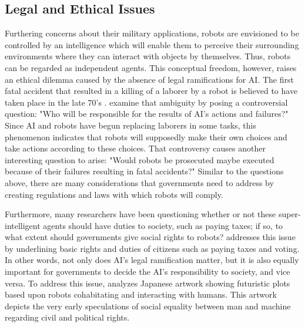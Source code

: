 \documentclass[man]{apa6}
\begin{document}
 \subsection{Legal and Ethical Issues}
Furthering concerns about their military applications, robots are envisioned to be controlled by an intelligence which will enable them to perceive their surrounding environments where they can interact with objects by themselves.
Thus, robots can be regarded as independent agents.
This conceptual freedom, however, raises an ethical dilemma caused by the absence of legal ramifications for AI.
The first fatal accident that resulted in a killing of a laborer by a robot is believed to have taken place in the late 70's \cite{lin}.
 examine that ambiguity by posing a controversial question: "Who will be responsible for the results of AI's actions and failures?"
Since AI and robots have begun replacing laborers in some tasks, this phenomenon indicates that robots will supposedly make their own choices and take actions according to these choices. That controversy causes another interesting question to arise: "Would robots be prosecuted maybe executed because of their failures resulting in fatal accidents?"
Similar to the questions above, there are many considerations that governments need to address by creating regulations and laws with which robots will comply. \par
Furthermore, many researchers have been questioning whether or not these super-intelligent agents should have duties to society, such as paying taxes; if so, to what extent should governments  give social rights to robots?
 addresses this issue by underlining basic rights and duties of citizens such as paying taxes and voting.
In other words, not only does AI's legal ramification matter, but it is also equally important for governments to decide the AI's responsibility to society, and vice versa.
To address this issue,  analyzes Japanese artwork showing futuristic plots based upon robots cohabitating and interacting with humans.
This artwork depicts the very early speculations of social equality between man and machine regarding civil and political rights.
\end{document}
